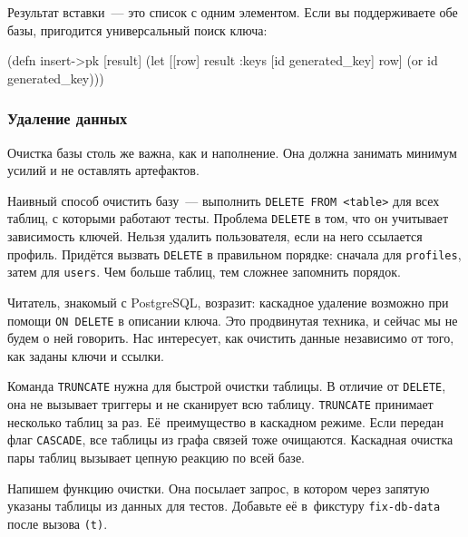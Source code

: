 \fi

Результат вставки~--- это список с одним элементом. Если вы поддерживаете обе базы,
пригодится универсальный поиск ключа:

\begin{english}
  \begin{clojure}
(defn insert->pk [result]
  (let [[row] result
        {:keys [id generated_key]} row]
    (or id generated_key)))
  \end{clojure}
\end{english}

\subsubsection*{Удаление данных}


Очистка базы столь же важна, как и наполнение. Она должна занимать минимум
усилий и не оставлять артефактов.

Наивный способ очистить базу~--- выполнить \verb|DELETE FROM <table>| для всех
таблиц, с которыми работают тесты. Проблема \verb|DELETE| в том, что он
учитывает зависимость ключей. Нельзя удалить пользователя, если на него
ссылается профиль. Придётся вызвать \verb|DELETE| в правильном порядке:
сначала для \verb|profiles|, затем для \verb|users|. Чем больше таблиц, тем
сложнее запомнить порядок.


Читатель, знакомый с PostgreSQL, возразит: каскадное удаление возможно при
помощи \verb|ON DELETE| в описании ключа. Это продвинутая техника, и сейчас
мы не будем о ней говорить. Нас интересует, как очистить данные независимо от
того, как заданы ключи и ссылки.


Команда \verb|TRUNCATE|  нужна для быстрой очистки таблицы. В
отличие от \verb|DELETE|, она не вызывает триггеры и не сканирует всю
таблицу. \verb|TRUNCATE| принимает несколько таблиц за раз. Её~преимущество в
каскадном режиме. Если передан флаг \verb|CASCADE|, все таблицы из графа связей
тоже очищаются. Каскадная очистка пары таблиц вызывает цепную реакцию по всей
базе.


Напишем функцию очистки. Она посылает запрос, в котором через запятую указаны
таблицы из данных для тестов. Добавьте её в~фикстуру \verb|fix-db-data| после
вызова \verb|(t)|.

